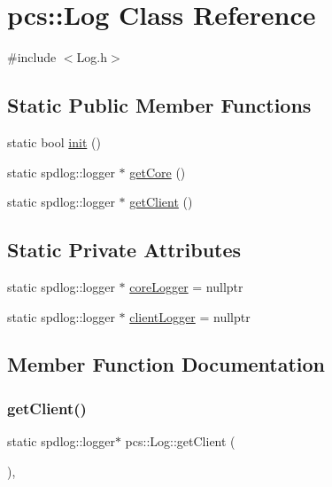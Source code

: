 \hypertarget{classpcs_1_1Log}{}\section{pcs\+:\+:Log Class Reference}
\label{classpcs_1_1Log}


{\ttfamily \#include $<$Log.\+h$>$}

\subsection*{Static Public Member Functions}
\begin{DoxyCompactItemize}
\item 
static bool \hyperlink{classpcs_1_1Log_aa1d8f9f771cbe8e22171a484a00cb26a}{init} ()
\item 
static spdlog\+::logger $\ast$ \hyperlink{classpcs_1_1Log_a80c9b3bf6063be52e378daa4b12b05d9}{get\+Core} ()
\item 
static spdlog\+::logger $\ast$ \hyperlink{classpcs_1_1Log_aaa4d7462a9140c5c71cf55320a233cbc}{get\+Client} ()
\end{DoxyCompactItemize}
\subsection*{Static Private Attributes}
\begin{DoxyCompactItemize}
\item 
static spdlog\+::logger $\ast$ \hyperlink{classpcs_1_1Log_a10c192099a05bf06b0b45ff11d6df3fc}{core\+Logger} = nullptr
\item 
static spdlog\+::logger $\ast$ \hyperlink{classpcs_1_1Log_aaaf4f92cf3f544bec35e425c2e3dbf90}{client\+Logger} = nullptr
\end{DoxyCompactItemize}


\subsection{Member Function Documentation}
\mbox{\label{classpcs_1_1Log_aaa4d7462a9140c5c71cf55320a233cbc}} 
\subsubsection{\texorpdfstring{get\+Client()}{getClient()}}
{\footnotesize\ttfamily static spdlog\+::logger$\ast$ pcs\+::\+Log\+::get\+Client (\begin{DoxyParamCaption}{ }\end{DoxyParamCaption})\hspace{0.3cm}{\ttfamily [inline]}, {\ttfamily [static]}}

